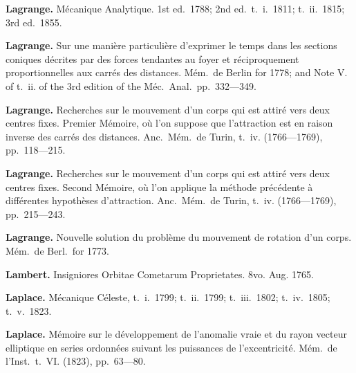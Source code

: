 \documentclass[12pt,a4paper]{article}
\theoremstyle{definition}
\begin{document}
\noindent\textbf{Lagrange.} M\'{e}canique Analytique. 1st ed.~1788; 2nd ed.~t.~i.~1811; t.~ii.~1815; 3rd ed.~1855.

\vspace{0.5em}

\noindent\textbf{Lagrange.} Sur une mani\`{e}re particuli\`{e}re d'exprimer le temps dans les sections coniques d\'{e}crites par des forces tendantes au foyer et r\'{e}ciproquement proportionnelles aux carr\'{e}s des distances. M\'{e}m.~de Berlin for 1778; and Note V. of t.~ii. of the 3rd edition of the M\'{e}c.~Anal.~pp.~332---349.

\vspace{0.5em}

\noindent\textbf{Lagrange.} Recherches sur le mouvement d'un corps qui est attir\'{e} vers deux centres fixes. Premier M\'{e}moire, o\`{u} l'on suppose que l'attraction est en raison inverse des carr\'{e}s des distances. Anc.~M\'{e}m.~de Turin, t.~iv. (1766---1769), pp.~118---215.

\vspace{0.5em}

\noindent\textbf{Lagrange.} Recherches sur le mouvement d'un corps qui est attir\'{e} vers deux centres fixes. Second M\'{e}moire, o\`{u} l'on applique la m\'{e}thode pr\'{e}c\'{e}dente \`{a} diff\'{e}rentes hypoth\`{e}ses d'attraction. Anc.~M\'{e}m.~de Turin, t.~iv. (1766---1769), pp.~215---243.

\vspace{0.5em}

\noindent\textbf{Lagrange.} Nouvelle solution du probl\`{e}me du mouvement de rotation d'un corps. M\'{e}m.~de Berl.~for 1773.

\vspace{0.5em}

\noindent\textbf{Lambert.} Insigniores Orbitae Cometarum Proprietates. 8vo. Aug. 1765.

\vspace{0.5em}

\noindent\textbf{Laplace.} M\'{e}canique C\'{e}leste, t.~i.~1799; t.~ii.~1799; t.~iii.~1802; t.~iv.~1805; t.~v.~1823.

\vspace{0.5em}

\noindent\textbf{Laplace.} M\'{e}moire sur le d\'{e}veloppement de l'anomalie vraie et du rayon vecteur elliptique en series ordonn\'{e}es suivant les puissances de l'excentricit\'{e}. M\'{e}m.~de l'Inst.~t.~VI. (1823), pp.~63---80.

\vspace{0.5em}
\end{document}
